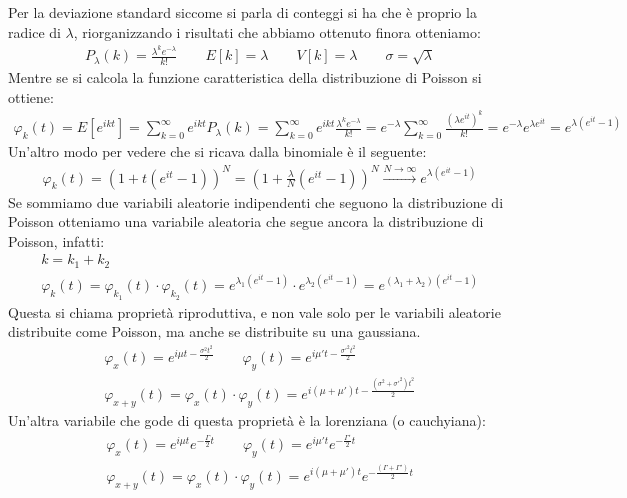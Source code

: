 \documentclass[a4paper, oneside]{article}
\begin{document}
Per la deviazione standard siccome si parla di conteggi si ha che è proprio la radice di $\lambda$, riorganizzando i risultati che abbiamo ottenuto finora otteniamo:
\begin{gather*}
    P_\lambda(k) = \frac{\lambda^k e^{-\lambda}}{k!} \qquad E[k] = \lambda \qquad V[k] = \lambda \qquad \sigma = \sqrt{\lambda}
\end{gather*}
Mentre se si calcola la funzione caratteristica della distribuzione di Poisson si ottiene:
\begin{gather*}
    \varphi_k(t) = E[e^{ikt}] = \sum_{k=0}^{\infty} e^{ikt} P_\lambda(k) = \sum_{k=0}^{\infty} e^{ikt} \frac{\lambda^k e^{-\lambda}}{k!} = e^{-\lambda} \sum_{k=0}^{\infty} \frac{(\lambda e^{it})^k}{k!} = e^{-\lambda} e^{\lambda e^{it}} = e^{\lambda (e^{it}-1)}
\end{gather*}
Un'altro modo per vedere che si ricava dalla binomiale è il seguente:
\begin{gather*}
    \varphi_k(t) = ( 1 + t(e^{it} - 1))^N = (1 + \frac{\lambda}{N} (e^{it}-1))^N \overset{N \to \infty}{\longrightarrow} e^{\lambda (e^{it}-1)}
\end{gather*}
Se sommiamo due variabili aleatorie indipendenti che seguono la distribuzione di Poisson otteniamo una variabile aleatoria che segue ancora la distribuzione di Poisson, infatti:
\begin{gather*}
    k = k_1 + k_2\\
    \varphi_k(t) = \varphi_{k_1}(t) \cdot \varphi_{k_2}(t) = e^{\lambda_1 (e^{it}-1)} \cdot e^{\lambda_2 (e^{it}-1)} = e^{(\lambda_1 + \lambda_2)(e^{it}-1)}
\end{gather*}
Questa si chiama proprietà riproduttiva, e non vale solo per le variabili aleatorie distribuite come Poisson, ma anche se distribuite su una gaussiana.
\begin{gather*}
    \varphi_x(t) = e^{i\mu t - \frac{\sigma^2 t^2}{2}} \qquad \varphi_y(t) = e^{i\mu' t - \frac{\sigma'^2 t^2}{2}}\\
    \varphi_{x+y}(t) = \varphi_x(t) \cdot \varphi_y(t) = e^{i(\mu + \mu') t - \frac{(\sigma^2 + \sigma'^2) t^2}{2}}
\end{gather*}
Un'altra variabile che gode di questa proprietà è la lorenziana (o cauchyiana):
\begin{gather*}
    \varphi_x(t) = e^{i \mu t} e^{-\frac{\Gamma}{2}t} \qquad \varphi_y(t) = e^{i \mu' t} e^{-\frac{\Gamma'}{2}t}\\
    \varphi_{x+y}(t) = \varphi_x(t) \cdot \varphi_y(t) = e^{i(\mu + \mu') t} e^{-\frac{(\Gamma + \Gamma')}{2}t}
\end{gather*}
\end{document}
